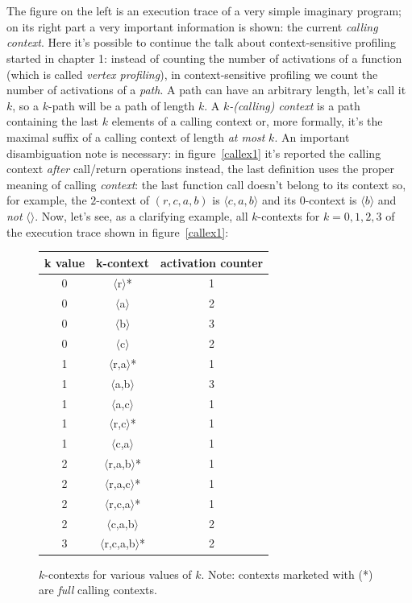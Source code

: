 \documentclass[a4paper,11pt]{report}
\begin{document}
\mbox{}\\ \mbox{}\\
The figure on the left is an execution trace of a very simple imaginary program; on its right part a very important information is shown: the current \emph{calling context}. 
Here it's possible to continue the talk about context-sensitive profiling started in chapter 1: instead of counting the number of activations of a function (which is called \emph{vertex profiling}), in context-sensitive profiling we count the number of activations of a \emph{path}. A path can have an arbitrary length, let's call it $k$, so a $k$-path will be a path of length $k$. A \emph{\mbox{$k$-(calling)} context} is a path containing the last $k$ elements of a calling context or, more formally, it's the maximal suffix of a calling context of length \emph{at most} $k$.
An important disambiguation note is necessary: in figure~\ref{callex1} it's reported the calling context \emph{after} call/return operations instead, the last definition uses the proper meaning of calling \emph{context}: the last function call doesn't belong to its context so, for example, the $2$-context of $(r,c,a,b)$ is $\langle c,a,b\rangle$ and its $0$-context is $\langle b\rangle$ and \emph{not} $\langle\rangle$.
Now, let's see, as a clarifying example, all $k$-contexts for $k=0,1,2,3$ of the execution trace shown in figure~\ref{callex1}:

\begin{figure}[h]
\begin{center}
\begin{tabular}{c|c|c}
\textbf{k value} & \textbf{k-context} & \textbf{activation counter}\\
\hline
0 & $\langle$r$\rangle$* & 1\\
0 & $\langle$a$\rangle$ & 2\\
0 & $\langle$b$\rangle$ & 3\\
0 & $\langle$c$\rangle$ & 2\\
\hline
1 & $\langle$r,a$\rangle$* & 1\\
1 & $\langle$a,b$\rangle$ & 3\\
1 & $\langle$a,c$\rangle$ & 1\\
1 & $\langle$r,c$\rangle$* & 1\\
1 & $\langle$c,a$\rangle$ & 1\\
\hline
2 & $\langle$r,a,b$\rangle$* & 1\\
2 & $\langle$r,a,c$\rangle$* & 1\\
2 & $\langle$r,c,a$\rangle$* & 1\\
2 & $\langle$c,a,b$\rangle$ & 2\\
\hline
3 & $\langle$r,c,a,b$\rangle$* & 2\\

\end{tabular}
\end{center}
\caption{$k$-contexts for various values of $k$.
Note: contexts marketed with (*) are \emph{full} calling contexts.}
\end{figure}
\end{document}
